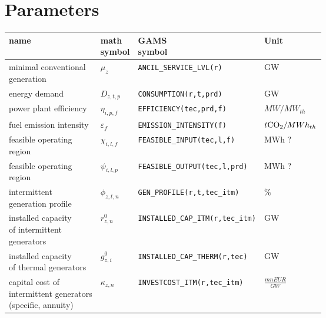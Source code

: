 \documentclass[11pt,a4paper]{article}
\begin{document}
\section{Parameters} \label{parameters}
\begin{tabular}{l l l l}
\textbf{name} & \makecell[l]{\textbf{math} \\ \textbf{symbol}} & \makecell[l]{\textbf{GAMS} \\\textbf{symbol}} & \textbf{Unit} \\
\hline \hline
\makecell[l]{minimal conventional \\generation} & $\mu_{z}$ & \texttt{ANCIL\_SERVICE\_LVL(r)} & GW \\ \hline
energy demand & $D_{z,t,p}$ & \texttt{CONSUMPTION(r,t,prd)} & GW \\ \hline
power plant efficiency & $\eta_{i,p,f}$ & \texttt{EFFICIENCY(tec,prd,f)} & $MW / MW_{th}$\\ \hline
fuel emission intensity & $\varepsilon_{f}$ & \texttt{EMISSION\_INTENSITY(f)} & $t \ce{CO2}/MWh_{th}$\\ \hline
\makecell[l]{feasible operating \\region} & $\chi_{i,l,f}$ & \texttt{FEASIBLE\_INPUT(tec,l,f)} & MWh ? \\ \hline
\makecell[l]{feasible operating \\region} & $\psi_{i,l,p}$ & \texttt{FEASIBLE\_OUTPUT(tec,l,prd)} & MWh ? \\ \hline
\makecell[l]{intermittent \\generation profile} & $\phi_{z,t,n}$ & \texttt{GEN\_PROFILE(r,t,tec\_itm)} & \% \\ \hline
\makecell[l]{installed capacity \\of intermittent \\generators} & $r^{0}_{z,n}$ & \texttt{INSTALLED\_CAP\_ITM(r,tec\_itm)} & GW \\ \hline
\makecell[l]{installed capacity \\of thermal generators} & $g^{0}_{z,i}$ & \texttt{INSTALLED\_CAP\_THERM(r,tec)} & GW \\ \hline
\makecell[l]{capital cost of \\intermittent generators \\(specific, annuity)} & $\kappa_{z,n}$ & \texttt{INVESTCOST\_ITM(r,tec\_itm)} & $\frac{mn EUR}{GW}$ \\ \hline

\end{tabular}
\end{document}
